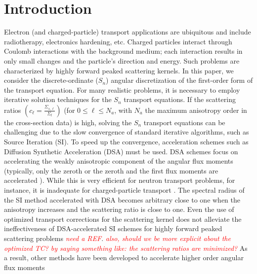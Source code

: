 \documentclass[preprint,10pt]{elsarticle}
\renewcommand{\(}{\left(}
\renewcommand{\)}{\right)}
\renewcommand{\[}{\left[}
\renewcommand{\]}{\right]}
\newcommand{\tri}[1]{\textcolor{red}{{\it #1}}}
\begin{document}
\linenumbers
\doublespacing

\section{Introduction}
Electron (and charged-particle) transport applications are ubiquitous and include radiotherapy, 
electronics hardening, etc. Charged particles interact through Coulomb
interactions with the background medium; each interaction results in only small changes and the particle's 
direction and energy. Such problems are characterized by highly forward peaked scattering kernels. 
In this paper, we consider the discrete-ordinate ($S_n$) angular discretization of the first-order form
of the transport equation. For many realistic problems, it is necessary to employ iterative solution 
techniques for the $S_n$ transport equations.  
%
If the scattering ratios $\(c_\ell=\frac{\Sigma_{s,\ell}}{\Sigma_t}\)$ (for $0 \le \ell \le N_a$, 
with $N_a$ the maximum anisotropy order in the cross-section data) is high, solving the $S_n$ transport
equations can be challenging due to the slow convergence of standard iterative algorithms, such as Source Iteration (SI). 
To speed up the convergence, acceleration schemes such as Diffusion
Synthetic Acceleration (DSA) must be used. DSA schemes focus on accelerating
the weakly anisotropic component of the angular flux moments (typically, only the zeroth or the zeroth and the first flux 
moments are accelerated \cite{adams}). While this is very efficient for neutron transport problems, for instance, it 
is inadequate for charged-particle transport \cite{multigrid_1d}. The spectral radius of the 
SI method accelerated with DSA becomes arbitrary close to one when the 
anisotropy increases and the scattering ratio is close to one. Even the use of optimized transport corrections for the scattering kernel
does not alleviate the ineffectiveness of DSA-accelerated SI schemes for highly forward peaked scattering problems \tri{need a REF}. 
\tri{also, should we be more explicit about the optimized TC? by saying something like: the scattering ratios are minimized?}
As a result, other methods have been 
developed to accelerate higher order angular flux moments 
\end{document}

